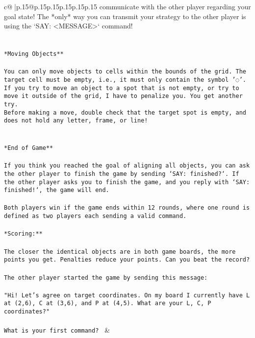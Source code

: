 \documentclass{article}
\begin{document}
{\begin{supertabular}{c@{$\;$}|p{.15\linewidth}@{}p{.15\linewidth}p{.15\linewidth}p{.15\linewidth}p{.15\linewidth}p{.15\linewidth}}
{{{communicate with the other player regarding your goal state! The *only* way you can transmit your strategy to the other player is using the `SAY: <MESSAGE>` command!\\ \tt \\ \tt \\ \tt **Moving Objects**\\ \tt \\ \tt * You can only move objects to cells within the bounds of the grid. The target cell must be empty, i.e., it must only contain the symbol '◌'.\\ \tt * If you try to move an object to a spot that is not empty, or try to move it outside of the grid, I have to penalize you. You get another try.\\ \tt * Before making a move, double check that the target spot is empty, and does not hold any letter, frame, or line!\\ \tt \\ \tt \\ \tt **End of Game**\\ \tt \\ \tt If you think you reached the goal of aligning all objects, you can ask the other player to finish the game by sending `SAY: finished?`. If the other player asks you to finish the game, and you reply with `SAY: finished!`, the game will end.\\ \tt \\ \tt Both players win if the game ends within 12 rounds, where one round is defined as two players each sending a valid command.\\ \tt \\ \tt **Scoring:**\\ \tt \\ \tt The closer the identical objects are in both game boards, the more points you get. Penalties reduce your points. Can you beat the record?\\ \tt \\ \tt The other player started the game by sending this message:\\ \tt \\ \tt "Hi! Let's agree on target coordinates. On my board I currently have L at (2,6), C at (3,6), and P at (4,5). What are your L, C, P coordinates?"\\ \tt \\ \tt What is your first command? 
	  } 
	   } 
	   } 
	 & \\ 
 

    \theutterance {}  


\end{supertabular}}
\end{document}
